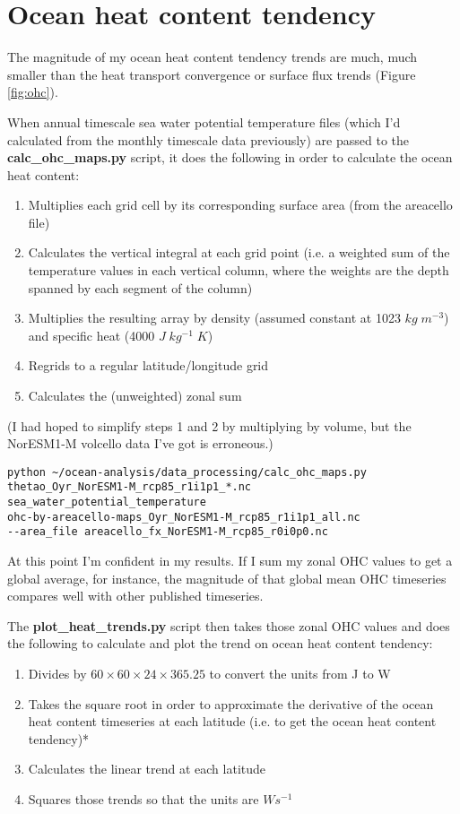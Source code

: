 \section{Ocean heat content tendency}

The magnitude of my ocean heat content tendency trends are much, much smaller than the heat transport convergence or surface flux trends (Figure \ref{fig:ohc}). 

When annual timescale sea water potential temperature files (which I'd calculated from the monthly timescale data previously) are passed to the \textbf{calc_ohc_maps.py} script, it does the following in order to calculate the ocean heat content:
\begin{enumerate}
\item Multiplies each grid cell by its corresponding surface area (from the areacello file)
\item Calculates the vertical integral at each grid point (i.e. a weighted sum of the temperature values in each vertical column, where the weights are the depth spanned by each segment of the column)
\item Multiplies the resulting array by density (assumed constant at 1023 $kg\; m^{-3}$) and specific heat (4000 $J\; kg^{-1}\; K$)
\item Regrids to a regular latitude/longitude grid
\item Calculates the (unweighted) zonal sum
\end{enumerate}

(I had hoped to simplify steps 1 and 2 by multiplying by volume, but the NorESM1-M volcello data I've got is erroneous.) 

\begin{verbatim}
python ~/ocean-analysis/data_processing/calc_ohc_maps.py 
thetao_Oyr_NorESM1-M_rcp85_r1i1p1_*.nc 
sea_water_potential_temperature 
ohc-by-areacello-maps_Oyr_NorESM1-M_rcp85_r1i1p1_all.nc 
--area_file areacello_fx_NorESM1-M_rcp85_r0i0p0.nc
\end{verbatim}

At this point I'm confident in my results. If I sum my zonal OHC values to get a global average, for instance, the magnitude of that global mean OHC timeseries compares well with other published timeseries.

The \textbf{plot_heat_trends.py} script then takes those zonal OHC values and does the following to calculate and plot the trend on ocean heat content tendency:
\begin{enumerate}
\item Divides by $60 \times 60 \times 24 \times 365.25$ to convert the units from J to W
\item Takes the square root in order to approximate the derivative of the ocean heat content timeseries at each latitude (i.e. to get the ocean heat content tendency)*
\item Calculates the linear trend at each latitude
\item Squares those trends so that the units are $W s^{-1}$
\end{enumerate}

